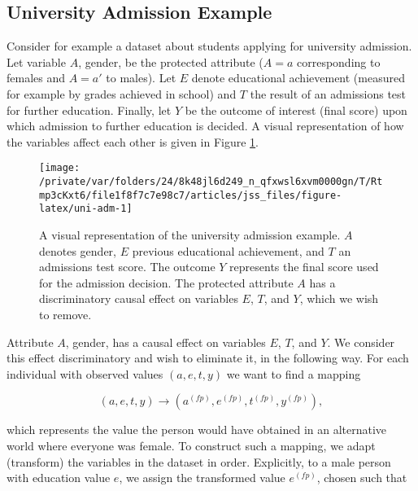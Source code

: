 \documentclass[
  nojss]{jss}
\begin{document}
\hypertarget{university-admission-example}{%
\subsection{University Admission
Example}\label{university-admission-example}}

Consider for example a dataset about students applying for university
admission. Let variable \(A\), gender, be the protected attribute
(\(A = a\) corresponding to females and \(A = a'\) to males). Let \(E\)
denote educational achievement (measured for example by grades achieved
in school) and \(T\) the result of an admissions test for further
education. Finally, let \(Y\) be the outcome of interest (final score)
upon which admission to further education is decided. A visual
representation of how the variables affect each other is given in Figure
\ref{fig:uni-adm}.

\begin{CodeChunk}
\begin{figure}

{\centering \texttt{[image: /private/var/folders/24/8k48jl6d249\_n\_qfxwsl6xvm0000gn/T/Rtmp3cKxt6/file1f8f7c7e98c7/articles/jss\_files/figure-latex/uni-adm-1]} 

}

\caption[A visual representation of the university admission example]{A visual representation of the university admission example. $A$ denotes gender, $E$ previous educational achievement, and $T$ an admissions test score. The outcome $Y$ represents the final score used for the admission decision. The protected attribute $A$ has a discriminatory causal effect on variables $E$, $T$, and $Y$, which we wish to remove.}\label{fig:uni-adm}
\end{figure}
\end{CodeChunk}

Attribute \(A\), gender, has a causal effect on variables \(E\), \(T\),
and \(Y\). We consider this effect discriminatory and wish to eliminate
it, in the following way. For each individual with observed values
\((a, e, t, y)\) we want to find a mapping

\[(a, e, t, y) \longrightarrow  ( {a}^{(fp)},  {e}^{(fp)},  {t}^{(fp)},  {y}^{(fp)}),\]

which represents the value the person would have obtained in an
alternative world where everyone was female. To construct such a
mapping, we adapt (transform) the variables in the dataset in order.
Explicitly, to a male person with education value \(e\), we assign the
transformed value \( {e}^{(fp)}\), chosen such that
\end{document}
